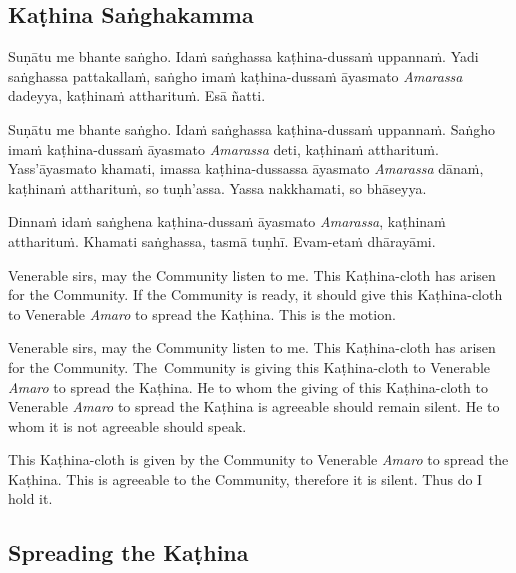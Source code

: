 \subsection{Kaṭhina Saṅghakamma}
\label{kathina-sanghakamma}

\enlargethispage{\baselineskip}


Suṇātu me bhante saṅgho. Idaṁ saṅghassa kaṭhina-dussaṁ uppannaṁ. Yadi saṅghassa
pattakallaṁ, saṅgho imaṁ kaṭhina-dussaṁ āyasmato \emph{Amarassa} dadeyya,
kaṭhinaṁ attharituṁ. Esā ñatti.

Suṇātu me bhante saṅgho. Idaṁ saṅghassa kaṭhina-dussaṁ uppannaṁ. Saṅgho imaṁ
kaṭhina-dussaṁ āyasmato \emph{Amarassa} deti, kaṭhinaṁ attharituṁ.
Yass'āyasmato khamati, imassa kaṭhina-dussassa āyasmato \emph{Amarassa} dānaṁ,
kaṭhinaṁ attharituṁ, so tuṇh'assa. Yassa nakkhamati, so bhāseyya.

Dinnaṁ idaṁ saṅghena kaṭhina-dussaṁ āyasmato \emph{Amarassa}, kaṭhinaṁ
attharituṁ. Khamati saṅghassa, tasmā tuṇhī. Evam-etaṁ dhārayāmi.


\begin{english}
Venerable sirs, may the Community listen to me. This Kaṭhina-cloth has arisen
for the Community. If the Community is ready, it should give this Kaṭhina-cloth
to Venerable \emph{Amaro} to spread the Kaṭhina. This is the motion.

\bigskip

Venerable sirs, may the Community listen to me. This Kaṭhina-cloth has arisen
for the Community. The~Community is giving this Kaṭhina-cloth to Venerable
\emph{Amaro} to spread the Kaṭhina. He to whom the giving of this Kaṭhina-cloth
to Venerable \emph{Amaro} to spread the Kaṭhina is agreeable should remain
silent. He to whom it is not agreeable should speak.

\bigskip

This Kaṭhina-cloth is given by the Community to Venerable \emph{Amaro} to
spread the Kaṭhina. This is agreeable to the Community, therefore it is silent.
Thus do I hold it.
\end{english}

\subsection{Spreading the Kaṭhina}
\label{spreading-the-kathina}

